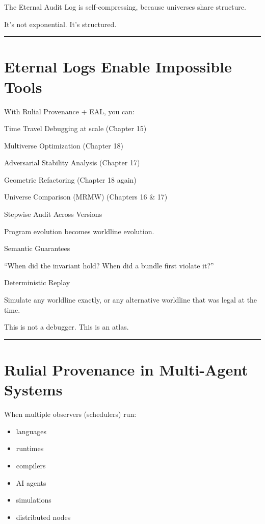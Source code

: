 The Eternal Audit Log is self-compressing, because universes share
structure.

It's not exponential. It's structured.

\begin{center}\rule{0.5\linewidth}{0.5pt}\end{center}

\section{Eternal Logs Enable Impossible
Tools}\label{eternal-logs-enable-impossible-tools}

With Rulial Provenance + EAL, you can:

Time Travel Debugging at scale (Chapter 15)

Multiverse Optimization (Chapter 18)

Adversarial Stability Analysis (Chapter 17)

Geometric Refactoring (Chapter 18 again)

Universe Comparison (MRMW) (Chapters 16 \& 17)

Stepwise Audit Across Versions

Program evolution becomes worldline evolution.

Semantic Guarantees

``When did the invariant hold? When did a bundle first violate it?''

Deterministic Replay

Simulate any worldline exactly, or any alternative worldline that was
legal at the time.

This is not a debugger. This is an atlas.

\begin{center}\rule{0.5\linewidth}{0.5pt}\end{center}

\section{Rulial Provenance in Multi-Agent
Systems}\label{rulial-provenance-in-multi-agent-systems}

When multiple observers (schedulers) run:

\begin{itemize}
\tightlist
\item
  languages
\item
  runtimes
\item
  compilers
\item
  AI agents
\item
  simulations
\item
  distributed nodes
\end{itemize}

